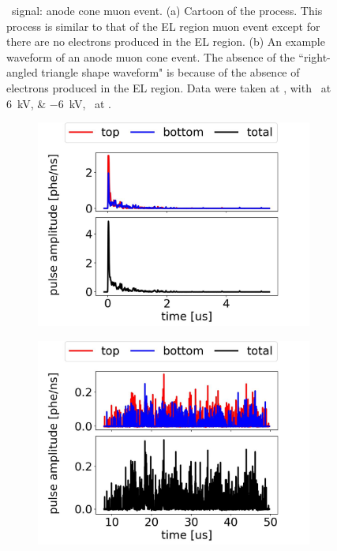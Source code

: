 \begin{figure}[!htbp]
\begin{subfigure}[b]{0.7\textwidth}
		\caption{}
		\label{fig:muon anode c}
	\end{subfigure}
	\caption[\gtest\ signal: anode cone muon event.]{\gtest\ signal: anode cone muon event. (a) Cartoon of the process. This process is similar to that of the EL region muon event except for there are no electrons produced in the EL region. (b) An example waveform of an anode muon cone event. The absence of the ``right-angled triangle shape waveform"  is because of the absence of electrons produced in the EL region. Data were taken at , with \opvtvb\ at \SIlist{+6;-6}{kV}, \opgd\ at \standarddensity .}
	\label{fig:muon anode}
\end{figure}
\begin{figure}[!htbp]\ContinuedFloat
	\centering
	\begin{subfigure}[b]{0.7\textwidth}
		\centering
		\includegraphics[width=\figurewidth,clip,trim={0 0 0 0}]{Figures/GasTest/exampleWaveforms/proc64767AnodeMuon1P1.jpg}
		\caption{}
		\label{fig:muon anode d}
	\end{subfigure}
		\par\bigskip
\begin{subfigure}[b]{0.7\textwidth}
	\centering
	\includegraphics[width=\figurewidth,clip,trim={0 0 0 0}]{Figures/GasTest/exampleWaveforms/proc64767AnodeMuon1P2.jpg}

\end{subfigure}
\end{figure}
